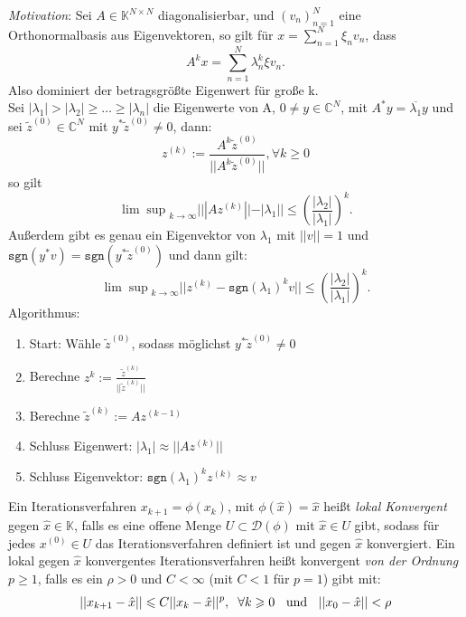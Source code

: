 \documentclass{report}
\begin{document}
 {
  \textit{Motivation}:
  Sei $A \in \mathbb{K}^{N \times N}$ diagonalisierbar,
  und $(v_n)_{n=1}^{N}$ eine Orthonormalbasis aus 
  Eigenvektoren, so gilt für $x = \sum_{n=1}^{N} \xi_n v_n$, dass 
  \[
    A^kx = \sum_{n=1}^{N} \lambda_n^k \xi v_n.
  \]
  Also dominiert der betragsgrößte Eigenwert für große 
  k.\\
  Sei $|\lambda_1| > |\lambda_2| \geq \dots \geq |\lambda_n|$
  die Eigenwerte von A, $0 \neq y \in \mathbb{C}^N$,
  mit $A^*y = \overline{\lambda_1}y$ und sei 
  $\tilde{z}^{(0)} \in \mathbb{C}^N$ mit 
  $y^*\tilde{z}^{(0)} \neq 0$,
  dann:
  \[
    z^{(k)} := \frac{A^k\tilde{z}^{(0)}}{||A^k\tilde{z}^{(0)}||},
    \forall k \geq 0
  \]
  so gilt 
  \[
    {\lim\sup}_{k \to \infty} |||Az^{(k)}|| - |\lambda_1|| \leq 
    \left(\frac{|\lambda_2|}{|\lambda_1|}\right)^k.
  \]
  Außerdem gibt es genau ein Eigenvektor von $\lambda_1$ mit 
  $||v|| = 1$ und $\texttt{sgn}(y^*v) = \texttt{sgn}(y^*\tilde{z}^{(0)})$
  und dann gilt:
  \[
    {\lim\sup}_{k \to \infty} ||z^{(k)} - \texttt{sgn}(\lambda_1)^kv|| \leq 
    \left(\frac{|\lambda_2|}{|\lambda_1|}\right)^k.
  \]
  Algorithmus:
  \begin{enumerate}
    \item Start: Wähle $\tilde{z}^{(0)}$, sodass möglichst 
      $y^*\tilde{z}^{(0)} \neq 0$
    \item Berechne $z^{k} := 
      \frac{\tilde{z}^{(k)}}{||\tilde{z}^{(k)}||}$
    \item Berechne $\tilde{z}^{(k)} := Az^{(k-1)}$
    \item Schluss Eigenwert: 
      $|\lambda_1| \approx ||Az^{(k)}||$
    \item Schluss Eigenvektor:
      $\texttt{sgn}(\lambda_1)^kz^{(k)} \approx v$
  \end{enumerate}
}
 {
  Ein Iterationsverfahren $x_{k+1} = \phi(x_k)$, mit 
  $\phi(\hat{x}) = \hat{x}$
  heißt \textit{lokal Konvergent}
    gegen $\hat{x}\in \mathbb{K}$, falls es eine offene 
    Menge $U \subset \mathcal{D}(\phi)$ mit $\hat{x}\in U$
    gibt, sodass für jedes $x^{(0)} \in U$ das Iterationsverfahren
    definiert ist und gegen $\hat{x}$ konvergiert.
}
 {
  Ein lokal gegen $\hat{x}$ konvergentes Iterationsverfahren
  heißt konvergent \textit{von der Ordnung} $p \geq 1$,
  falls es ein $\rho > 0$ und $C < \infty$ (mit $C < 1$ für $p=1$)
  gibt mit:
  \[
    ||x_{k+1} - \hat{x}|| \leq C ||x_k - \hat{x}||^p, 
    \hspace{0.2cm}
    \forall k \geq 0 \hspace{0.2cm} \text{ und }\hspace{0.2cm}
    ||x_0 - \hat{x}|| < \rho
  \]
}
\end{document}
